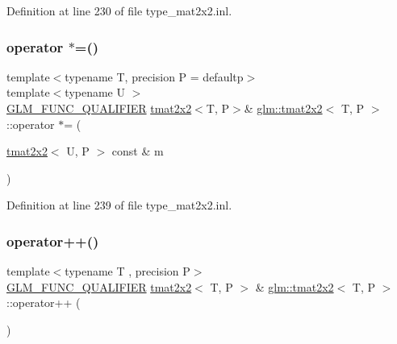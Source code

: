 Definition at line 230 of file type\+\_\+mat2x2.\+inl.

\mbox{\label{structglm_1_1tmat2x2_aec795a5240b0d23aff31f1806970d95a}} 
\subsubsection{\texorpdfstring{operator $\ast$=()}{operator *=()}\hspace{0.1cm}{\footnotesize\ttfamily [4/4]}}
{\footnotesize\ttfamily template$<$typename T, precision P = defaultp$>$ \\
template$<$typename U $>$ \\
\mbox{\hyperlink{setup_8hpp_a33fdea6f91c5f834105f7415e2a64407}{G\+L\+M\+\_\+\+F\+U\+N\+C\+\_\+\+Q\+U\+A\+L\+I\+F\+I\+ER}} \mbox{\hyperlink{structglm_1_1tmat2x2}{tmat2x2}}$<$T, P$>$\& \mbox{\hyperlink{structglm_1_1tmat2x2}{glm\+::tmat2x2}}$<$ T, P $>$\+::operator $\ast$= (\begin{DoxyParamCaption}\item[{\mbox{\hyperlink{structglm_1_1tmat2x2}{tmat2x2}}$<$ U, P $>$ const \&}]{m }\end{DoxyParamCaption})}



Definition at line 239 of file type\+\_\+mat2x2.\+inl.

\mbox{\label{structglm_1_1tmat2x2_a9b29f7cc4e8fb411fcb0a7f1c26f5cd2}} 
\subsubsection{\texorpdfstring{operator++()}{operator++()}\hspace{0.1cm}{\footnotesize\ttfamily [1/2]}}
{\footnotesize\ttfamily template$<$typename T , precision P$>$ \\
\mbox{\hyperlink{setup_8hpp_a33fdea6f91c5f834105f7415e2a64407}{G\+L\+M\+\_\+\+F\+U\+N\+C\+\_\+\+Q\+U\+A\+L\+I\+F\+I\+ER}} \mbox{\hyperlink{structglm_1_1tmat2x2}{tmat2x2}}$<$ T, P $>$ \& \mbox{\hyperlink{structglm_1_1tmat2x2}{glm\+::tmat2x2}}$<$ T, P $>$\+::operator++ (\begin{DoxyParamCaption}{ }\end{DoxyParamCaption})}



